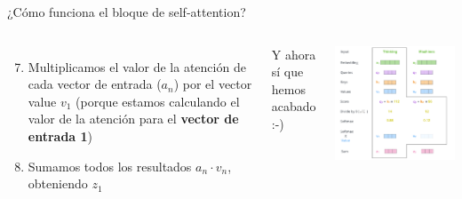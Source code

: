 \begin{frame}{¿Cómo funciona el bloque de self-attention?}

\begin{columns}
\begin{enumerate}
\setcounter{enumi}{6}
    \item Multiplicamos el valor de la atención de cada vector de entrada ($a_n$) por el vector value $v_1$ (porque estamos calculando el valor de la atención para el \textbf{vector de entrada 1})
    \item Sumamos todos los resultados $a_n \cdot v_n$, obteniendo $z_1$

\end{enumerate}
\vspace{1em}
Y ahora sí que hemos acabado :-)

\vspace{0.2em}
\includegraphics[width=\textwidth]{Slides/figures/02_Metodos_Generativos/trans-att5.png}

\end{columns}
\end{frame}


